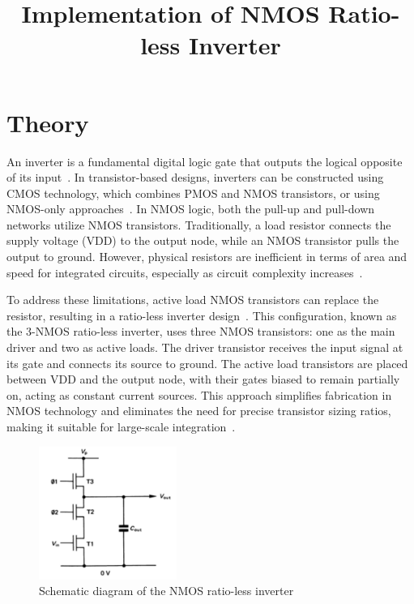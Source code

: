 \documentclass[12pt]{article}
\title{ Implementation of NMOS Ratio-less Inverter}
\author{}
\date{}
\begin{document}


\pagebreak

\tableofcontents

\pagebreak
{}
\maketitle

\section*{Theory}
An inverter is a fundamental digital logic gate that outputs the logical opposite of its input~\cite{weste2015cmos}. In transistor-based designs, inverters can be constructed using CMOS technology, which combines PMOS and NMOS transistors, or using NMOS-only approaches~\cite{kang2003cmos}. In NMOS logic, both the pull-up and pull-down networks utilize NMOS transistors. Traditionally, a load resistor connects the supply voltage (VDD) to the output node, while an NMOS transistor pulls the output to ground. However, physical resistors are inefficient in terms of area and speed for integrated circuits, especially as circuit complexity increases~\cite{sze2008physics}.

To address these limitations, active load NMOS transistors can replace the resistor, resulting in a ratio-less inverter design~\cite{rabaey2003digital}. This configuration, known as the 3-NMOS ratio-less inverter, uses three NMOS transistors: one as the main driver and two as active loads. The driver transistor receives the input signal at its gate and connects its source to ground. The active load transistors are placed between VDD and the output node, with their gates biased to remain partially on, acting as constant current sources. This approach simplifies fabrication in NMOS technology and eliminates the need for precise transistor sizing ratios, making it suitable for large-scale integration~\cite{kang2003cmos}.

\begin{figure}[H]
    \centering
    \includegraphics[width=0.4\textwidth]{th.png}
    \caption{Schematic diagram of the NMOS ratio-less inverter}
\end{figure}
\end{document}
